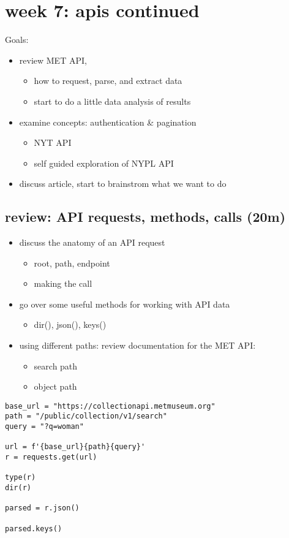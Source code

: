 \documentclass[11pt]{article}
\author{fcalado}
\date{\today}
\title{}
\begin{document}
\tableofcontents

\section{week 7: apis continued}
\label{sec:org8f7ae74}
Goals:
\begin{itemize}
\item review MET API,
\begin{itemize}
\item how to request, parse, and extract data
\item start to do a little data analysis of results
\end{itemize}
\item examine concepts: authentication \& pagination
\begin{itemize}
\item NYT API
\item self guided exploration of NYPL API
\end{itemize}
\item discuss article, start to brainstrom what we want to do
\end{itemize}

\subsection{review: API requests, methods, calls (20m)}
\label{sec:orgf027e9d}
\begin{itemize}
\item discuss the anatomy of an API request
\begin{itemize}
\item root, path, endpoint
\item making the call
\end{itemize}
\item go over some useful methods for working with API data
\begin{itemize}
\item dir(), json(), keys()
\end{itemize}
\item using different paths: review documentation for the MET API: 
\begin{itemize}
\item search path
\item object path
\end{itemize}
\end{itemize}

\begin{verbatim}
base_url = "https://collectionapi.metmuseum.org"
path = "/public/collection/v1/search"
query = "?q=woman"

url = f'{base_url}{path}{query}'
r = requests.get(url)

type(r)
dir(r)

parsed = r.json()

parsed.keys()

\end{verbatim}
\end{document}
